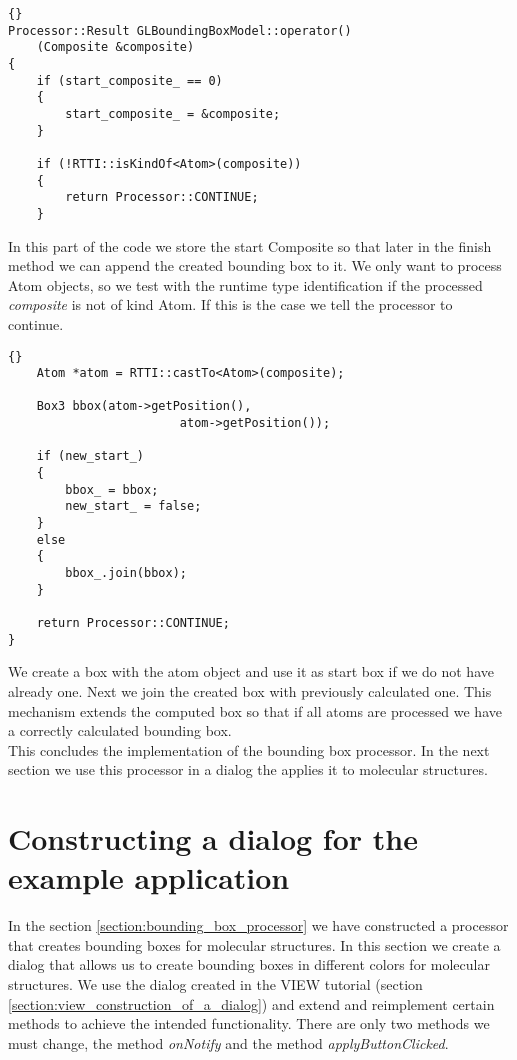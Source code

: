 \begin{lstlisting}{}
Processor::Result GLBoundingBoxModel::operator() 
	(Composite &composite)
{
	if (start_composite_ == 0)
	{
		start_composite_ = &composite;
	}

	if (!RTTI::isKindOf<Atom>(composite))
	{
		return Processor::CONTINUE;
	}
\end{lstlisting}

In this part of the code we store the start Composite so that later in the finish
method we can append the created bounding box to it.
We only want to process Atom objects, so we test with the runtime type
identification if the processed {\em composite} is not of kind Atom. If this
is the case we tell the processor to continue.

\begin{lstlisting}{}
	Atom *atom = RTTI::castTo<Atom>(composite);

	Box3 bbox(atom->getPosition(), 
						atom->getPosition());

	if (new_start_)
	{
		bbox_ = bbox;
		new_start_ = false;
	}
	else
	{
		bbox_.join(bbox);
	}

	return Processor::CONTINUE;
}
\end{lstlisting}

We create a box with the atom object and use it as start box if we do not have already
one. Next we join the created box with previously calculated one. This mechanism
extends the computed box so that if all atoms are processed we have a correctly calculated
bounding box.\\

This concludes the implementation of the bounding box processor. In the next
section we use this processor in a dialog the applies it to molecular structures.



\section{Constructing a dialog for the example application}
\label{section:construction_of_a_dialog}

In the section \ref{section:bounding_box_processor} we have constructed a processor that creates bounding boxes
for molecular structures. In this section we create a dialog that allows us to
create bounding boxes in different colors for molecular structures. We use the dialog
created in the VIEW tutorial (section \ref{section:view_construction_of_a_dialog}) and extend and 
reimplement certain methods to achieve the intended functionality.
There are only two methods we must change, the method {\em onNotify} and the method
{\em applyButtonClicked}.

